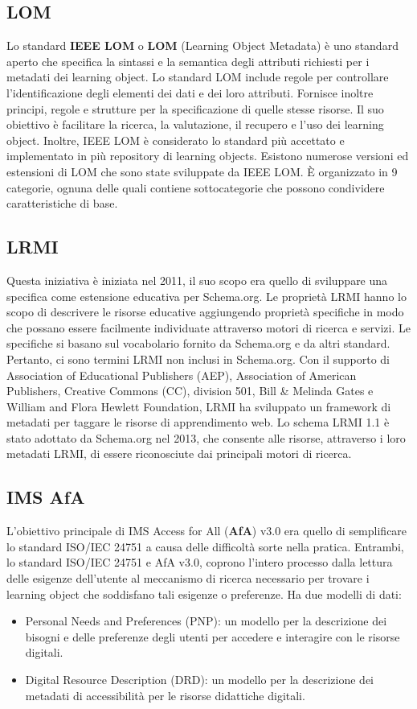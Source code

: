 \subsection{LOM}
Lo standard \textbf{IEEE LOM} o \textbf{LOM} (Learning Object Metadata) è uno standard aperto che
specifica la sintassi e la semantica degli attributi richiesti per i metadati dei learning object. Lo standard LOM include regole per controllare l'identificazione degli elementi dei dati e dei loro attributi. Fornisce inoltre principi, regole e strutture per la specificazione di quelle stesse risorse. Il suo obiettivo è facilitare la ricerca, la valutazione, il recupero e l'uso dei learning object. Inoltre, IEEE LOM è considerato lo standard più accettato e implementato in più repository di learning objects. Esistono numerose versioni ed estensioni di LOM che sono state sviluppate da IEEE LOM. È organizzato in 9 categorie, ognuna delle quali contiene sottocategorie che possono condividere caratteristiche di base.

\subsection{LRMI}
Questa iniziativa è iniziata nel 2011, il suo scopo era quello di sviluppare una specifica come estensione educativa per Schema.org. Le proprietà LRMI hanno lo scopo di descrivere le risorse educative aggiungendo proprietà specifiche in modo che possano essere facilmente individuate attraverso motori di ricerca e servizi. Le specifiche si basano sul vocabolario fornito da Schema.org e da altri standard. Pertanto, ci sono termini LRMI non inclusi in Schema.org. Con il supporto di Association of Educational Publishers (AEP), Association of American Publishers, Creative Commons (CC), division 501, Bill \& Melinda Gates e William and Flora Hewlett Foundation, LRMI ha sviluppato un framework di metadati per taggare le risorse di apprendimento web. Lo schema LRMI 1.1 è stato adottato da Schema.org nel 2013, che consente alle risorse, attraverso i loro metadati LRMI, di essere riconosciute dai principali motori di ricerca.

\subsection{IMS AfA}
L'obiettivo principale di IMS Access for All (\textbf{AfA}) v3.0 era quello di semplificare lo standard ISO/IEC 24751 a causa delle difficoltà sorte nella pratica. Entrambi, lo standard ISO/IEC 24751 e AfA v3.0, coprono l'intero processo dalla lettura delle esigenze dell'utente al meccanismo di ricerca necessario per trovare i learning object che soddisfano tali esigenze o preferenze. Ha due modelli di dati:
\begin{itemize}
\item Personal Needs and Preferences (PNP): un modello per la descrizione dei bisogni e delle preferenze degli utenti per accedere e interagire con le risorse digitali.
\item Digital Resource Description (DRD): un modello per la descrizione dei metadati di accessibilità per le risorse didattiche digitali.
\end{itemize}

